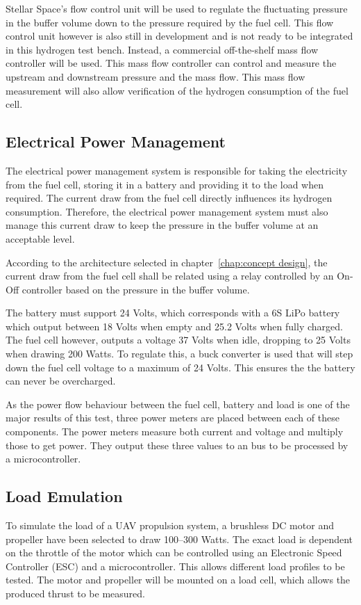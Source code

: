Stellar Space's flow control unit will be used to regulate the fluctuating pressure in the buffer volume down to the pressure required by the fuel cell. This flow control unit however is also still in development and is not ready to be integrated in this hydrogen test bench. Instead, a commercial off-the-shelf mass flow controller will be used. This mass flow controller can control and measure the upstream and downstream pressure and the mass flow. This mass flow measurement will also allow verification of the hydrogen consumption of the fuel cell.


\subsection*{Electrical Power Management}
The electrical power management system is responsible for taking the electricity from the fuel cell, storing it in a battery and providing it to the load when required. The current draw from the fuel cell directly influences its hydrogen consumption. Therefore, the electrical power management system must also manage this current draw to keep the pressure in the buffer volume at an acceptable level.

According to the architecture selected in chapter~\ref{chap:concept design}, the current draw from the fuel cell shall be related using a relay controlled by an On-Off controller based on the pressure in the buffer volume.

The battery must support 24 Volts, which corresponds with a 6S LiPo battery which output between 18 Volts when empty and 25.2 Volts when fully charged. The fuel cell however, outputs a voltage 37 Volts when idle, dropping to 25 Volts when drawing 200 Watts. To regulate this, a buck converter is used that will step down the fuel cell voltage to a maximum of 24 Volts. This ensures the the battery can never be overcharged.

As the power flow behaviour between the fuel cell, battery and load is one of the major results of this test, three power meters are placed between each of these components. The power meters measure both current and voltage and multiply those to get power. They output these three values to an \iic bus to be processed by a microcontroller.


\subsection*{Load Emulation}
To simulate the load of a UAV propulsion system, a brushless DC motor and propeller have been selected to draw 100--300 Watts. The exact load is dependent on the throttle of the motor which can be controlled using an Electronic Speed Controller (ESC) and a microcontroller. This allows different load profiles to be tested. The motor and propeller will be mounted on a load cell, which allows the produced thrust to be measured.

